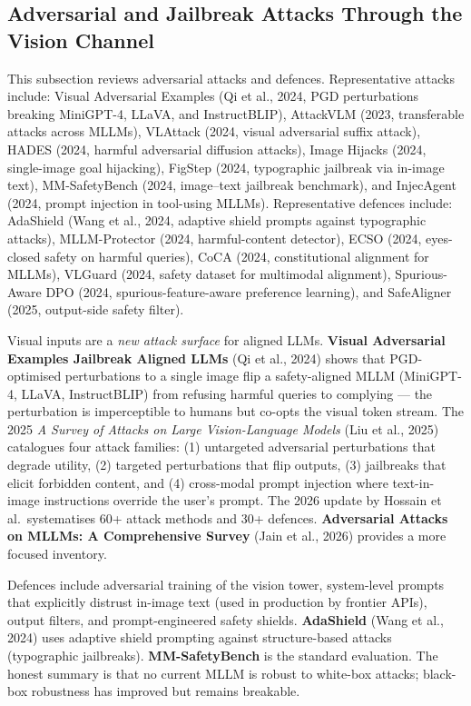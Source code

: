 \subsection{Adversarial and Jailbreak Attacks Through the Vision Channel}\label{adversarial-and-jailbreak-attacks-through-the-vision-channel}

This subsection reviews adversarial attacks and defences. Representative attacks include: Visual Adversarial Examples (Qi et al., 2024, PGD perturbations breaking MiniGPT-4, LLaVA, and InstructBLIP), AttackVLM (2023, transferable attacks across MLLMs), VLAttack (2024, visual adversarial suffix attack), HADES (2024, harmful adversarial diffusion attacks), Image Hijacks (2024, single-image goal hijacking), FigStep (2024, typographic jailbreak via in-image text), MM-SafetyBench (2024, image--text jailbreak benchmark), and InjecAgent (2024, prompt injection in tool-using MLLMs). Representative defences include: AdaShield (Wang et al., 2024, adaptive shield prompts against typographic attacks), MLLM-Protector (2024, harmful-content detector), ECSO (2024, eyes-closed safety on harmful queries), CoCA (2024, constitutional alignment for MLLMs), VLGuard (2024, safety dataset for multimodal alignment), Spurious-Aware DPO (2024, spurious-feature-aware preference learning), and SafeAligner (2025, output-side safety filter).

Visual inputs are a \emph{new attack surface} for aligned LLMs. \textbf{Visual Adversarial Examples Jailbreak Aligned LLMs} (Qi et al., 2024) shows that PGD-optimised perturbations to a single image flip a safety-aligned MLLM (MiniGPT-4, LLaVA, InstructBLIP) from refusing harmful queries to complying --- the perturbation is imperceptible to humans but co-opts the visual token stream. The 2025 \emph{A Survey of Attacks on Large Vision-Language Models} (Liu et al., 2025) catalogues four attack families: (1) untargeted adversarial perturbations that degrade utility, (2) targeted perturbations that flip outputs, (3) jailbreaks that elicit forbidden content, and (4) cross-modal prompt injection where text-in-image instructions override the user's prompt. The 2026 update by Hossain et al.~systematises 60+ attack methods and 30+ defences. \textbf{Adversarial Attacks on MLLMs: A Comprehensive Survey} (Jain et al., 2026) provides a more focused inventory.

Defences include adversarial training of the vision tower, system-level prompts that explicitly distrust in-image text (used in production by frontier APIs), output filters, and prompt-engineered safety shields. \textbf{AdaShield} (Wang et al., 2024) uses adaptive shield prompting against structure-based attacks (typographic jailbreaks). \textbf{MM-SafetyBench} is the standard evaluation. The honest summary is that no current MLLM is robust to white-box attacks; black-box robustness has improved but remains breakable.

